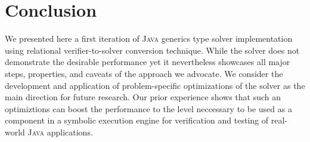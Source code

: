 \section{Conclusion}
\label{sec:conclusion}

We presented here a first iteration of \textsc{Java} generics type solver implementation using relational verifier-to-solver
conversion technique. While the solver does not demonstrate the desirable performance yet it nevertheless showcases all
major steps, properties, and caveats of the approach we advocate. We consider the development and application of problem-specific
optimizations of the solver as the main direction for future research. Our prior experience shows that such an optimiztions
can boost the performance to the level neccessary to be used as a component in a symbolic execution engine for verification
and testing of real-world \textsc{Java} applications.
